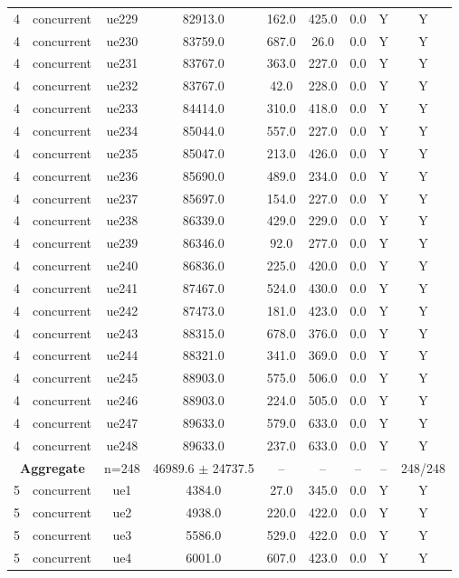\begin{table}[ht]
\begin{tabular}{|c|c|c|c|c|c|c|c|c|}
4 & concurrent & ue229 & 82913.0 & 162.0 & 425.0 & 0.0 & Y & Y \\
4 & concurrent & ue230 & 83759.0 & 687.0 & 26.0 & 0.0 & Y & Y \\
4 & concurrent & ue231 & 83767.0 & 363.0 & 227.0 & 0.0 & Y & Y \\
4 & concurrent & ue232 & 83767.0 & 42.0 & 228.0 & 0.0 & Y & Y \\
4 & concurrent & ue233 & 84414.0 & 310.0 & 418.0 & 0.0 & Y & Y \\
4 & concurrent & ue234 & 85044.0 & 557.0 & 227.0 & 0.0 & Y & Y \\
4 & concurrent & ue235 & 85047.0 & 213.0 & 426.0 & 0.0 & Y & Y \\
4 & concurrent & ue236 & 85690.0 & 489.0 & 234.0 & 0.0 & Y & Y \\
4 & concurrent & ue237 & 85697.0 & 154.0 & 227.0 & 0.0 & Y & Y \\
4 & concurrent & ue238 & 86339.0 & 429.0 & 229.0 & 0.0 & Y & Y \\
4 & concurrent & ue239 & 86346.0 & 92.0 & 277.0 & 0.0 & Y & Y \\
4 & concurrent & ue240 & 86836.0 & 225.0 & 420.0 & 0.0 & Y & Y \\
4 & concurrent & ue241 & 87467.0 & 524.0 & 430.0 & 0.0 & Y & Y \\
4 & concurrent & ue242 & 87473.0 & 181.0 & 423.0 & 0.0 & Y & Y \\
4 & concurrent & ue243 & 88315.0 & 678.0 & 376.0 & 0.0 & Y & Y \\
4 & concurrent & ue244 & 88321.0 & 341.0 & 369.0 & 0.0 & Y & Y \\
4 & concurrent & ue245 & 88903.0 & 575.0 & 506.0 & 0.0 & Y & Y \\
4 & concurrent & ue246 & 88903.0 & 224.0 & 505.0 & 0.0 & Y & Y \\
4 & concurrent & ue247 & 89633.0 & 579.0 & 633.0 & 0.0 & Y & Y \\
4 & concurrent & ue248 & 89633.0 & 237.0 & 633.0 & 0.0 & Y & Y \\
\multicolumn{2}{|c|}{\textbf{Aggregate}} & n=248 & 46989.6 $\pm$ 24737.5 & -- & -- & -- & -- & 248/248 \\
\hline
5 & concurrent & ue1 & 4384.0 & 27.0 & 345.0 & 0.0 & Y & Y \\
5 & concurrent & ue2 & 4938.0 & 220.0 & 422.0 & 0.0 & Y & Y \\
5 & concurrent & ue3 & 5586.0 & 529.0 & 422.0 & 0.0 & Y & Y \\
5 & concurrent & ue4 & 6001.0 & 607.0 & 423.0 & 0.0 & Y & Y \\

\end{tabular}
\end{table}
